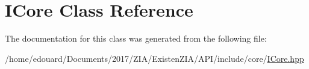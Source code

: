 \hypertarget{classICore}{}\section{I\+Core Class Reference}
\label{classICore}


The documentation for this class was generated from the following file\+:\begin{DoxyCompactItemize}
\item 
/home/edouard/\+Documents/2017/\+Z\+I\+A/\+Existen\+Z\+I\+A/\+A\+P\+I/include/core/\mbox{\hyperlink{ICore_8hpp}{I\+Core.\+hpp}}\end{DoxyCompactItemize}
